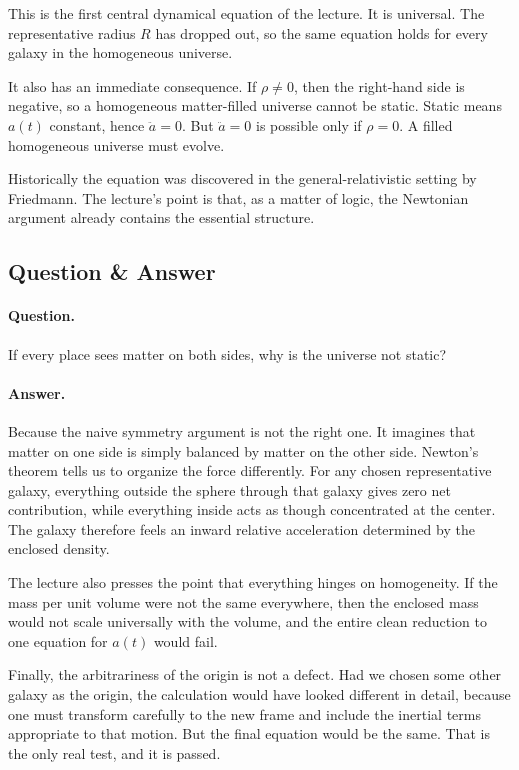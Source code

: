 This is the first central dynamical equation of the lecture. It is universal. The representative radius \(R\) has dropped out, so the same equation holds for every galaxy in the homogeneous universe.

It also has an immediate consequence. If \(\rho\neq 0\), then the right-hand side is negative, so a homogeneous matter-filled universe cannot be static. Static means \(a(t)\) constant, hence \(\ddot a=0\). But \(\ddot a=0\) is possible only if \(\rho=0\). A filled homogeneous universe must evolve.

Historically the equation was discovered in the general-relativistic setting by Friedmann. The lecture's point is that, as a matter of logic, the Newtonian argument already contains the essential structure.

\subsection{Question \& Answer}

\paragraph{Question.} If every place sees matter on both sides, why is the universe not static?

\paragraph{Answer.} Because the naive symmetry argument is not the right one. It imagines that matter on one side is simply balanced by matter on the other side. Newton's theorem tells us to organize the force differently. For any chosen representative galaxy, everything outside the sphere through that galaxy gives zero net contribution, while everything inside acts as though concentrated at the center. The galaxy therefore feels an inward relative acceleration determined by the enclosed density.

The lecture also presses the point that everything hinges on homogeneity. If the mass per unit volume were not the same everywhere, then the enclosed mass would not scale universally with the volume, and the entire clean reduction to one equation for \(a(t)\) would fail.

Finally, the arbitrariness of the origin is not a defect. Had we chosen some other galaxy as the origin, the calculation would have looked different in detail, because one must transform carefully to the new frame and include the inertial terms appropriate to that motion. But the final equation would be the same. That is the only real test, and it is passed.

